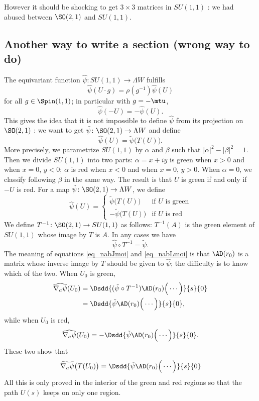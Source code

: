 However it should be shocking to get $3\times 3$ matrices in $SU(1,1)$ : we had abused between $\SO(2,1)$ and $SU(1,1)$.

\subsection{Another way to write a section (wrong way to do)}

The equivariant function $\hat{\psi}\colon SU(1,1)\to \Lambda W$ fulfills 
\[ 
  \hat{\psi}(U\cdot g)=\rho(g^{-1})\hat{\psi}(U)
\]
for all $g\in\Spin(1,1)$; in particular with $g=-\mtu$,
\begin{equation}
 \hat{\psi}(-U)=-\hat{\psi}(U).
\end{equation}
This gives the idea that it is not impossible to define $\hat{\psi}$ from its projection on $\SO(2,1)$ : we want to get $\tilde{\psi}\colon \SO(2,1)\to \Lambda W$ and define 
\[ 
  \hat{\psi}(U)=\tilde{\psi}\big( T(U) \big).
\]
More precisely, we parametrize $SU(1,1)$ by $\alpha$ and $\beta$ such that $| \alpha |^2-| \beta |^2=1$. Then we divide $SU(1,1)$ into two parts: $\alpha=x+iy$ is green when $x>0$ and when $x=0$, $y<0$; $\alpha$ is red when $x<0$ and when $x=0$, $y>0$. When $\alpha=0$, we classify following $\beta$ in the same way. The result is that $U$ is green if and only if $-U$ is red. For a map $\tilde{\psi}\colon \SO(2,1)\to \Lambda W$, we define
\begin{equation}
\hat{\psi}(U)=
\begin{cases}
\tilde{\psi}\big( T(U) \big)&\text{if $U$ is green}\\
-\tilde{\psi}\big(T(U)\big)&\text{if $U$ is red}
\end{cases}
\end{equation}
We define $T^{-1}\colon \SO(2,1)\to SU(1,1)$ as follows: $T^{-1}(A)$ is the green element of $SU(1,1)$ whose image by $T$ is $A$. In any cases we have
\[ 
\hat{\psi}\circ T^{-1}=\tilde{\psi}.  
\]
The meaning of equations \eqref{eq_nabJmoi} and \eqref{eq_nabLmoi} is that $\AD(r_0)$ is a matrix whose inverse image by $T$ should be given to $\hat{\psi}$; the difficulty is to know which of the two. When $U_0$ is green,
\[ 
 \begin{split}
\widehat{\nabla_a\psi}(U_0)&=\Dsdd{ (\hat{\psi}\circ T^{-1})  \AD(r_0)\Big( \cdots \Big)   }{s}{0} \\
        &=\Dsdd{ \tilde{\psi} \AD(r_0)\Big( \cdots \Big)}{s}{0},
\end{split} 
\]
while when $U_0$ is red,
\[ 
  \widehat{\nabla_a\psi}(U_0)=-\Dsdd{ \tilde{\psi}\AD(r_0)\Big( \cdots \Big) }{s}{0}.
\]
These two show that
\begin{equation}
\widetilde{\nabla_a\psi}\big( T(U_0) \big)=\Dsdd{   \tilde{\psi}\AD(r_0)\Big( \cdots \Big)    }{s}{0}
\end{equation}
All this is only proved in the interior of the green and red regions so that the path $U(s)$ keeps on only one region.

